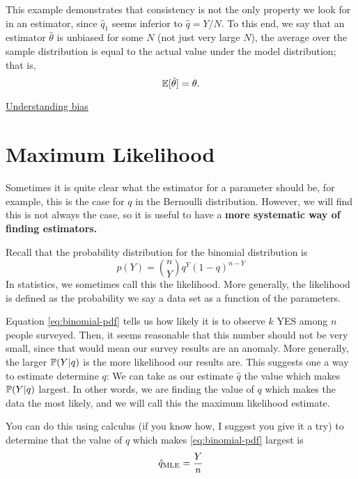 This example demonstrates that consistency is not the only property we look for in an estimator, since $\hat{q}_1$ seems inferior to $\hat{q} = Y/N$. To this end, we say that an estimator $\hat{\theta}$ is {\dfn unbiased} for some $N$ (not just very large $N$), the average over the sample distribution is equal to the actual value under the model distribution; that is, 
\begin{equation}
\mathbb E[\hat{\theta}] = \theta. 
\end{equation}

\begin{exercise}
 \href{https://colab.research.google.com/drive/1QarJhwPmSqCTQ-HwU_lXCUX6uvdhLdrM#scrollTo=US27cD1JgXn_&line=3&uniqifier=1}{Understanding bias}
\end{exercise} 


\section{Maximum Likelihood}

Sometimes it is quite clear what the estimator for a parameter should be, for example, this is the case for $q$ in the Bernoulli distribution. However, we will find this is not always the case, so it is useful to have a {\bf more systematic way of finding estimators.} 

Recall that the probability distribution for the binomial distribution is 
\begin{equation}\label{eq:binomial-pdf}
p(Y) = {n \choose Y}q^Y(1-q)^{n-Y}
\end{equation}
In statistics, we sometimes call this the {\dfn likelihood}. More generally, the likelihood is defined as the probability we say a data set as a function of the parameters. 

Equation \eqref{eq:binomial-pdf} tells us how likely it is to observe $k$ YES among $n$ people surveyed. Then, it seems reasonable that this number should not be very small, since that would mean our survey results are an anomaly. More generally, the larger $\mathbb P(Y|q)$ is the more likelihood our results are. This suggests one a way to estimate determine $q$: We can take as our estimate $\hat{q}$ the value which makes $\mathbb P(Y|q)$ largest. In other words, we are finding the value of $q$ which makes the data the most likely, and we will call this the {\dfn  maximum likelihood estimate}.

You can do this using calculus (if you know how, I suggest you give it a try) to determine that the value of $q$ which makes \eqref{eq:binomial-pdf} largest is \begin{equation}
\hat{q}_{\rm MLE} = \frac{Y}{n}
\end{equation}



